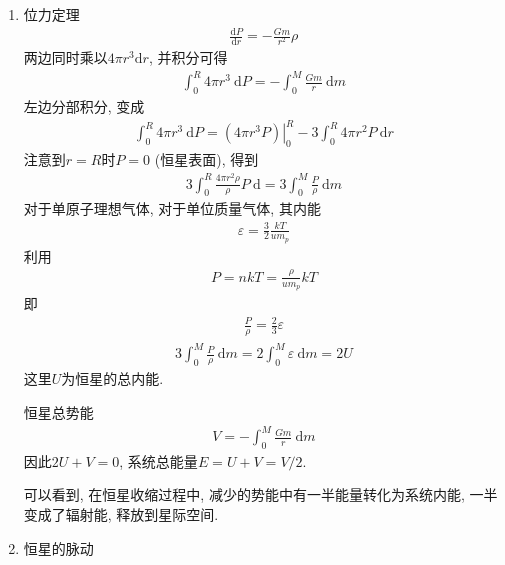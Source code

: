 \begin{enumerate}
    \item 位力定理
    \begin{align*}
        \frac{\mathrm{d}P}{\mathrm{d}r}=-\frac{Gm}{r^2}\rho
    \end{align*}
    两边同时乘以$4\pi r^3 \mathrm{d}r$, 并积分可得
    \begin{align*}
        \int_0^R 4\pi r^3\ \mathrm{d}P=-\int_{0}^{M}\frac{Gm}{r}\ \mathrm{d}m
    \end{align*}
    左边分部积分, 变成
    \begin{align*}
        \int_0^R 4\pi r^3\ \mathrm{d}P=\left.(4\pi r^3 P)\right|_0^R - 3\int_0^R 4\pi r^2 P \ \mathrm{d}r
    \end{align*}
    注意到$r=R$时$P=0$ (恒星表面), 得到
    \begin{align*}
        3\int_0^R \frac{4\pi r^2 \rho}{\rho} P \ \mathrm{d}=3\int_{0}^{M}\frac{P}{\rho}\ \mathrm{d}m
    \end{align*}
    对于单原子理想气体, 对于单位质量气体, 其内能 
    \begin{align*}
        \varepsilon=\frac{3}{2}\frac{kT}{u m_p}
    \end{align*}
    利用
    \begin{align*}
        P=nkT=\frac{\rho}{u m_p}kT
    \end{align*}
    即
    \begin{align*}
        \frac{P}{\rho}=\frac{2}{3}\varepsilon
    \end{align*}
    \begin{align*}
        3\int_{0}^{M}\frac{P}{\rho}\ \mathrm{d}m=2\int_{0}^{M}\varepsilon\ \mathrm{d}m=2U
    \end{align*}
    这里$U$为恒星的总内能. 

    恒星总势能
    \begin{align*}
        V=-\int_{0}^{M}\frac{Gm}{r}\ \mathrm{d}m
    \end{align*}
    因此$2U+V=0$, 系统总能量$E=U+V=V/2$. 

    可以看到, 在恒星收缩过程中, 减少的势能中有一半能量转化为系统内能, 一半变成了辐射能, 释放到星际空间. 

    \item 恒星的脉动
    

\end{enumerate}
